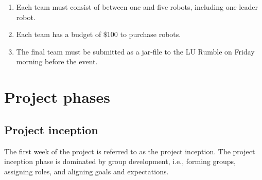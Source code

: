 \documentclass{scrreprt}
\begin{document}
\begin{enumerate}
\item Each team must consist of between one and five robots, including one leader robot.
\item Each team has a budget of \$100 to purchase robots.
\item The final team must be submitted as a jar-file to the LU Rumble on Friday morning before the event. 
\end{enumerate}

\chapter{Project phases}

\section{Project inception}
The first week of the project is referred to as the project inception. The project inception phase is dominated by group development, i.e., forming groups, assigning roles, and aligning goals and expectations.
\end{document}
